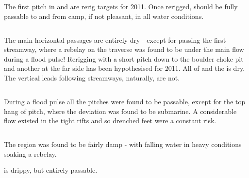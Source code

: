 The first pitch in  and  are rerig targets for 2011. Once
rerigged,  should be fully passable to and from camp, if not pleasant,
in all water conditions.

\subsection{}

The main horizontal passages are entirely dry - except for passing
the first streamway, where a rebelay on the traverse was found to
be under the main flow during a flood pulse! Rerigging with a short
pitch down to the boulder choke pit and another at the far side has
been hypothesised for 2011. All of  and the  is dry. The vertical leads following streamways, naturally,
are not.


\subsection{}

During a flood pulse all the pitches were found to be passable, except
for the top hang of  pitch, where the deviation was found
to be submarine. A considerable flow existed in the tight rifts and
so drenched feet were a constant risk.


\subsection{}

The region was found to be fairly damp - with falling water in heavy conditions
soaking a rebelay. 

 is drippy, but entirely passable.

